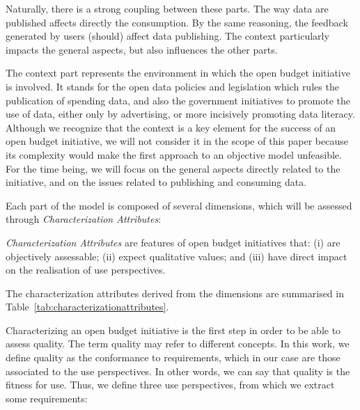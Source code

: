 Naturally, there is a strong coupling between these parts. 
The way data are published affects directly the consumption. 
By the same reasoning, the feedback generated by users (should) affect data publishing. 
The context particularly impacts the general aspects, but also influences the other parts.

The context part represents the environment in which the open budget initiative is involved. 
It stands for the open data policies and legislation which rules the publication of spending data, and also the government initiatives to promote the use of data, either only by advertising, or more incisively promoting data literacy.
Although we recognize that the context is a key element for the success of an open budget initiative, we will not consider it in the scope of this paper because its complexity would make the first approach to an objective model unfeasible. 
For the time being, we will focus on the general aspects directly related to the initiative, and on the issues related to publishing and consuming data. 

Each part of the model is composed of several dimensions, which will be assessed through \emph{Characterization Attributes}:

\begin{defn}
\emph{Characterization Attributes} are features of open budget initiatives that: 
(i) are objectively assessable; 
(ii) expect qualitative values; and 
(iii) have direct impact on the realisation of use perspectives.
\end{defn}
The characterization attributes derived from the dimensions are summarised in Table~\ref{tab:characterizationattributes}.

Characterizing an open budget initiative is the first step in order to be able to assess quality. 
The term quality may refer to different concepts. 
In this work, we define quality as the conformance to requirements, which in our case are those associated to the use perspectives. In other words, we can say that quality is the fitness for use. Thus, we define three use perspectives, from which we extract some requirements:

\vspace*{1mm}

